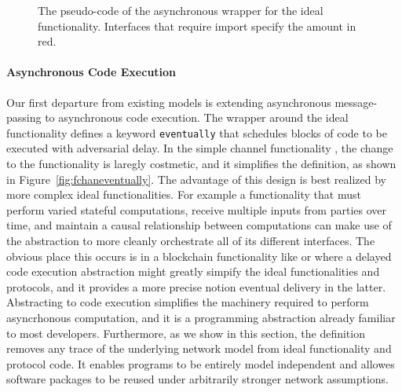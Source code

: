 
\begin{figure}

\caption{The pseudo-code of the asynchronous wrapper for the ideal functionality. Interfaces that require import specify the amount in red.}
\label{fig:wrapper}
\end{figure}

\paragraph{Asynchronous Code Execution}  Our first departure from
existing models is extending asynchronous message-passing to asynchronous code
execution.  The wrapper around the ideal functionality defines a keyword
\texttt{eventually} that schedules blocks of code to be executed with
adversarial delay.  In the simple channel functionality \Fchan, the change to
the functionality is laregly costmetic, and it simplifies the definition, as
shown in Figure~\ref{fig:fchaneventually}.  The advantage of this design is
best realized by more complex ideal functionalities.  For example a
functionality that must perform varied stateful computations, receive multiple
inputs from parties over time, and maintain a causal relationship between
computations can make use of the abstraction to more cleanly orchestrate all of
its different interfaces.  The obvious place this occurs is in a blockchain
functionality like \cite{badertscher2024bitcoin} or \cite{miller2019sprites}
where a delayed code execution abstraction might greatly simpify the ideal
functionalities and protocols, and it provides a more precise notion eventual
delivery in the latter.  Abstracting to code execution simplifies the machinery
required to perform asyncrhonous computation, and it is a programming
abstraction already familiar to most developers.  Furthermore, as we show in
this section, the definition removes any trace of the underlying network model
from ideal functionality and protocol code.  It enables programs to be entirely
model independent and allowes software packages to be reused under arbitrarily
stronger network assumptions.

